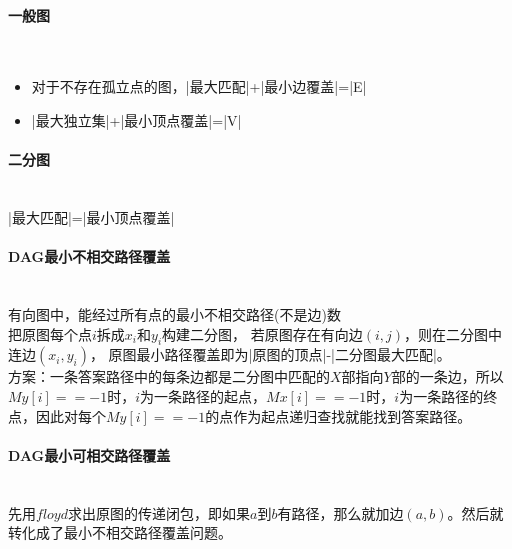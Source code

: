 \paragraph{一般图}~{}
\\
\begin{itemize}
\item 对于不存在孤立点的图，|最大匹配|+|最小边覆盖|=|E|
\item |最大独立集|+|最小顶点覆盖|=|V|
\end{itemize}

\paragraph{二分图}~{}
\\
|最大匹配|=|最小顶点覆盖|

\paragraph{DAG最小不相交路径覆盖}~{}
\\
有向图中，能经过所有点的最小不相交路径(不是边)数\\
把原图每个点$i$拆成$x_i$和$y_i$构建二分图，
若原图存在有向边$(i, j)$，则在二分图中连边$(x_i, y_i)$，
原图最小路径覆盖即为|原图的顶点|-|二分图最大匹配|。\\
方案：一条答案路径中的每条边都是二分图中匹配的$X$部指向$Y$部的一条边，所以$My[i]==-1$时，$i$为一条路径的起点，$Mx[i]==-1$时，$i$为一条路径的终点，因此对每个$My[i]==-1$的点作为起点递归查找就能找到答案路径。
\paragraph{DAG最小可相交路径覆盖}~{}
\\
先用$floyd$求出原图的传递闭包，即如果$a$到$b$有路径，那么就加边$(a, b)$。然后就转化成了最小不相交路径覆盖问题。
